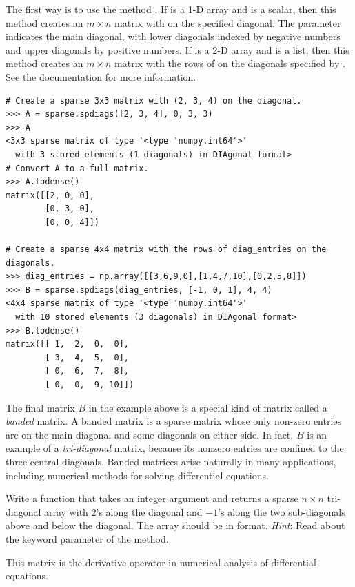 The first way is to use the method .
If  is a 1-D array and  is a scalar, then this method creates an $m \times n$ matrix with  on the specified diagonal.
The parameter  indicates the main diagonal, with lower diagonals indexed by negative numbers and upper diagonals by positive numbers.
If  is a 2-D array and  is a list, then this method creates an $m \times n$ matrix with the rows of  on the diagonals specified by .
See the documentation for more information.

\begin{lstlisting}
# Create a sparse 3x3 matrix with (2, 3, 4) on the diagonal.
>>> A = sparse.spdiags([2, 3, 4], 0, 3, 3)
>>> A
<3x3 sparse matrix of type '<type 'numpy.int64'>'
  with 3 stored elements (1 diagonals) in DIAgonal format>
# Convert A to a full matrix.
>>> A.todense()
matrix([[2, 0, 0],
        [0, 3, 0],
        [0, 0, 4]])

# Create a sparse 4x4 matrix with the rows of diag_entries on the diagonals.
>>> diag_entries = np.array([[3,6,9,0],[1,4,7,10],[0,2,5,8]])
>>> B = sparse.spdiags(diag_entries, [-1, 0, 1], 4, 4)
<4x4 sparse matrix of type '<type 'numpy.int64'>'
  with 10 stored elements (3 diagonals) in DIAgonal format>
>>> B.todense()
matrix([[ 1,  2,  0,  0],
        [ 3,  4,  5,  0],
        [ 0,  6,  7,  8],
        [ 0,  0,  9, 10]])
\end{lstlisting}

The final matrix $B$ in the example above is a special kind of matrix called a \emph{banded} matrix.
A banded matrix is a sparse matrix whose only non-zero entries are on the main diagonal and some diagonals on either side.
In fact, $B$ is an example of a \emph{tri-diagonal} matrix, because its nonzero entries are confined to the three central diagonals.
Banded matrices arise naturally in many applications, including numerical methods for solving differential equations.

\begin{problem}
Write a function that takes an integer argument  and returns a sparse $n\times n$
tri-diagonal array with $2$'s along the diagonal and $-1$'s along
the two sub-diagonals above and below the diagonal.
The array should be in  format.
\emph{Hint}: Read about the  keyword parameter of the  method.

This matrix is the derivative operator in numerical analysis of differential equations.
\label{prob:sparse_tridiag}
\end{problem}

